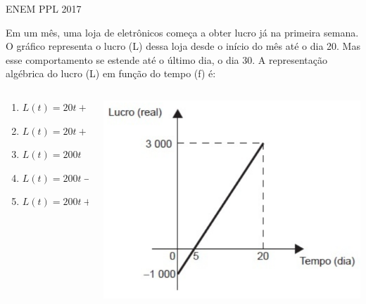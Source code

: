 \documentclass[11pt]{beamer}
\begin{document}
\begin{frame}{ENEM PPL 2017}

    Em um mês, uma loja de eletrônicos começa a obter lucro já na primeira semana. O gráfico representa o lucro (L) dessa loja desde o início do mês até o dia 20. Mas esse comportamento se estende até o último dia, o dia 30. A representação algébrica do lucro (L) em função do tempo (f) é:

    \begin{columns}
        \begin{column}{0.4\textwidth}
            \begin{enumerate}[a]
                \item $L(t) = 20t+ 3 000$ 
                \item $L(t) = 20t+ 4 000$
                \item $L(t) = 200t$
                \item $L(t) = 200t-1 000$ %
                \item $L(t) = 200t+ 3 000$
            \end{enumerate}
        \end{column}

        \begin{column}{0.5\textwidth}
            \centering
            \includegraphics[scale=0.4]{imagens/q1.png}
        \end{column}
    \end{columns}

\end{frame}
\end{document}

